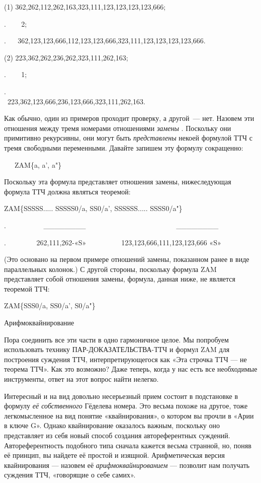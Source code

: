 \documentclass[../main.tex]{subfiles}
\begin{document}
(1) 362,262,112,262,163,323,111,123,123,123,123,666;

.~ ~ ~2;

. ~ ~362,123,123,666,112,123,123,666,323,111,123,123,123,123,666.

(2) 223,362,262,236,262,323,111,262,163;

.~ ~ ~1;

.~ ~ ~223,362,123,666,236,123,666,323,111,262,163.~~~~~~~~~~~~~~~~~~~~~~~~~~~~

Как обычно, один из примеров проходит проверку, а другой~--- нет. Назовем эти отношения между тремя номерами отношениями \emph{замены} . Поскольку они примитивно рекурсивны, они могут быть \emph{представлены} некоей формулой ТТЧ с тремя свободными переменными. Давайте запишем эту формулу сокращенно:

~~~ZAM\{a, a', a"\}

Поскольку эта формула представляет отношения замены, нижеследующая формула ТТЧ должна являться теоремой:

ZAM\{SSSSS..... SSSSS0/a, SS0/a', SSSSSS..... SSSS0/a"\}

.~~~~~~~~~ ~\textbar\_\_\_\_\_\_\_\_\textbar~~~~~~~~~~~~~~~~~~~~~~~~ ~\textbar\_\_\_\_\_\_\_\_\textbar{}

.~~~~~~~ ~262,111,262-«S»~~~~~~~~~~123,123,666,111,123,123,666 «S»

(Это основано на первом примере отношений замены, показанном ранее в виде параллельных колонок.) С другой стороны, поскольку формула ZAM представляет собой отношения замены, формула, данная ниже, не является теоремой ТТЧ:

ZAM\{SSS0/a, SS0/a', S0/a"\}

Арифмоквайнирование

Пора соединить все эти части в одно гармоничное целое. Мы попробуем использовать технику ПАР-ДОКАЗАТЕЛЬСТВА-ТТЧ и формул ZAM для построения суждения ТТЧ, интерпретирующегося как «Эта строчка ТТЧ --- не теорема ТТЧ». Как это возможно? Даже теперь, когда у нас есть все необходимые инструменты, ответ на этот вопрос найти нелегко.

Интересный и на вид довольно несерьезный прием состоит в подстановке в формулу \emph{её собственного} Гёделева номера. Это весьма похоже на другое, тоже легкомысленное на вид понятие «квайнирования», о котором вы прочли в «Арии в ключе G». Однако квайнирование оказалось важным, поскольку оно представляет из себя новый способ создания автореферентных суждений. Автореферентность подобного типа сначала кажется весьма странной, но, поняв её принцип, вы найдете её простой и изящной. Арифметическая версия квайнирования --- назовем её \emph{арифмоквайнированием} --- позволит нам получать суждения ТТЧ, «говорящие о себе самих».
\end{document}
